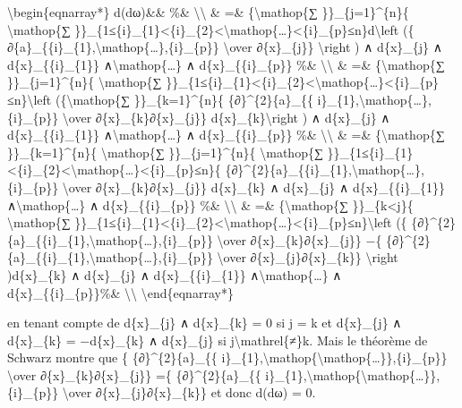 \documentclass[]{article}
\begin{document}
\textbackslash{}begin\{eqnarray*\} d(dω)\&\& \%\&
\textbackslash{}\textbackslash{} \& =\& \{\textbackslash{}mathop\{∑
\}\}\_\{j=1\}\^{}\{n\}\{ \textbackslash{}mathop\{∑
\}\}\_\{1≤\{i\}\_\{1\}\textless{}\{i\}\_\{2\}\textless{}\textbackslash{}mathop\{\ldots{}\}\textless{}\{i\}\_\{p\}≤n\}d\textbackslash{}left
(\{
∂\{a\}\_\{\{i\}\_\{1\},\textbackslash{}mathop\{\ldots{}\},\{i\}\_\{p\}\}
\textbackslash{}over ∂\{x\}\_\{j\}\} \textbackslash{}right ) ∧
d\{x\}\_\{j\} ∧ d\{x\}\_\{\{i\}\_\{1\}\}
∧\textbackslash{}mathop\{\ldots{}\} ∧ d\{x\}\_\{\{i\}\_\{p\}\} \%\&
\textbackslash{}\textbackslash{} \& =\& \{\textbackslash{}mathop\{∑
\}\}\_\{j=1\}\^{}\{n\}\{ \textbackslash{}mathop\{∑
\}\}\_\{1≤\{i\}\_\{1\}\textless{}\{i\}\_\{2\}\textless{}\textbackslash{}mathop\{\ldots{}\}\textless{}\{i\}\_\{p\}≤n\}\textbackslash{}left
(\{\textbackslash{}mathop\{∑ \}\}\_\{k=1\}\^{}\{n\}\{
\{∂\}\^{}\{2\}\{a\}\_\{\{
i\}\_\{1\},\textbackslash{}mathop\{\ldots{}\},\{i\}\_\{p\}\}
\textbackslash{}over ∂\{x\}\_\{k\}∂\{x\}\_\{j\}\}
d\{x\}\_\{k\}\textbackslash{}right ) ∧ d\{x\}\_\{j\} ∧
d\{x\}\_\{\{i\}\_\{1\}\} ∧\textbackslash{}mathop\{\ldots{}\} ∧
d\{x\}\_\{\{i\}\_\{p\}\} \%\& \textbackslash{}\textbackslash{} \& =\&
\{\textbackslash{}mathop\{∑ \}\}\_\{k=1\}\^{}\{n\}\{
\textbackslash{}mathop\{∑ \}\}\_\{j=1\}\^{}\{n\}\{
\textbackslash{}mathop\{∑
\}\}\_\{1≤\{i\}\_\{1\}\textless{}\{i\}\_\{2\}\textless{}\textbackslash{}mathop\{\ldots{}\}\textless{}\{i\}\_\{p\}≤n\}\{
\{∂\}\^{}\{2\}\{a\}\_\{\{i\}\_\{1\},\textbackslash{}mathop\{\ldots{}\},\{i\}\_\{p\}\}
\textbackslash{}over ∂\{x\}\_\{k\}∂\{x\}\_\{j\}\} d\{x\}\_\{k\} ∧
d\{x\}\_\{j\} ∧ d\{x\}\_\{\{i\}\_\{1\}\}
∧\textbackslash{}mathop\{\ldots{}\} ∧ d\{x\}\_\{\{i\}\_\{p\}\} \%\&
\textbackslash{}\textbackslash{} \& =\& \{\textbackslash{}mathop\{∑
\}\}\_\{k\textless{}j\}\{ \textbackslash{}mathop\{∑
\}\}\_\{1≤\{i\}\_\{1\}\textless{}\{i\}\_\{2\}\textless{}\textbackslash{}mathop\{\ldots{}\}\textless{}\{i\}\_\{p\}≤n\}\textbackslash{}left
(\{
\{∂\}\^{}\{2\}\{a\}\_\{\{i\}\_\{1\},\textbackslash{}mathop\{\ldots{}\},\{i\}\_\{p\}\}
\textbackslash{}over ∂\{x\}\_\{k\}∂\{x\}\_\{j\}\} −\{
\{∂\}\^{}\{2\}\{a\}\_\{\{i\}\_\{1\},\textbackslash{}mathop\{\ldots{}\},\{i\}\_\{p\}\}
\textbackslash{}over ∂\{x\}\_\{j\}∂\{x\}\_\{k\}\} \textbackslash{}right
)d\{x\}\_\{k\} ∧ d\{x\}\_\{j\} ∧ d\{x\}\_\{\{i\}\_\{1\}\}
∧\textbackslash{}mathop\{\ldots{}\} ∧ d\{x\}\_\{\{i\}\_\{p\}\}\%\&
\textbackslash{}\textbackslash{} \textbackslash{}end\{eqnarray*\}

en tenant compte de d\{x\}\_\{j\} ∧ d\{x\}\_\{k\} = 0 si j = k et
d\{x\}\_\{j\} ∧ d\{x\}\_\{k\} = −d\{x\}\_\{k\} ∧ d\{x\}\_\{j\} si
j\textbackslash{}mathrel\{≠\}k. Mais le théorème de Schwarz montre que
\{ \{∂\}\^{}\{2\}\{a\}\_\{\{
i\}\_\{1\},\textbackslash{}mathop\{\textbackslash{}mathop\{\ldots{}\}\},\{i\}\_\{p\}\}
\textbackslash{}over ∂\{x\}\_\{k\}∂\{x\}\_\{j\}\} =\{
\{∂\}\^{}\{2\}\{a\}\_\{\{
i\}\_\{1\},\textbackslash{}mathop\{\textbackslash{}mathop\{\ldots{}\}\},\{i\}\_\{p\}\}
\textbackslash{}over ∂\{x\}\_\{j\}∂\{x\}\_\{k\}\} et donc d(dω) = 0.
\end{document}
